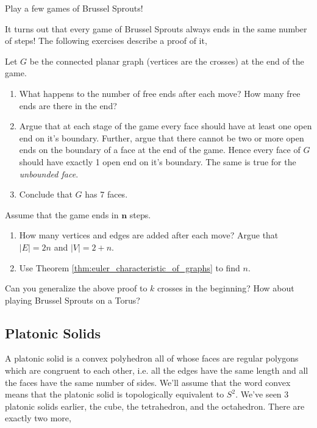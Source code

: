 \begin{exercise}
	Play a few games of Brussel Sprouts!
\end{exercise}

It turns out that every game of Brussel Sprouts always ends in the same number of steps! The following exercises describe a proof of it,

\begin{exercise}Let $G$ be the connected planar graph (vertices are the crosses) at the end of the game.
	\begin{enumerate}
		\item What happens to the number of free ends after each move? How many free ends are there in the end?
		\item Argue that at each stage of the game every face should have at least one open end on it's boundary. Further, argue that there cannot be two or more open ends on the boundary of a face at the end of the game. Hence every face of $G$ should have exactly 1 open end on it's boundary. The same is true for the \textit{unbounded face}.
		\item Conclude that $G$ has 7 faces.
	\end{enumerate}
\end{exercise}

\begin{exercise}
	Assume that the game ends in $ \mathbf{n} $ steps.
	\begin{enumerate}
		\item How many vertices and edges are added after each move? Argue that $ |E| = 2n $ and $ |V| = 2 + n $.
		\item Use Theorem \ref{thm:euler_characteristic_of_graphs} to find $ n $.
	\end{enumerate}
\end{exercise}
Can you generalize the above proof to $k$ crosses in the beginning? How about playing Brussel Sprouts on a Torus?

\iffalse\subsection{Platonic Solids}
A platonic solid is a convex polyhedron all of whose faces are regular polygons which are congruent to each other, i.e. all the edges have the same length and all the faces have the same number of sides. We'll assume that the word convex means that the platonic solid is topologically equivalent to $S^2$. We've seen 3 platonic solids earlier, the cube, the tetrahedron, and the octahedron. There are exactly two more,

